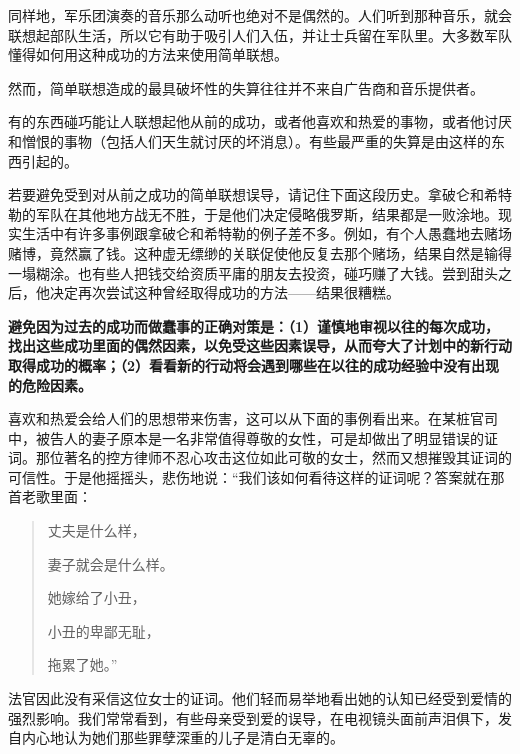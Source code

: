 同样地，军乐团演奏的音乐那么动听也绝对不是偶然的。人们听到那种音乐，就会联想起部队生活，所以它有助于吸引人们入伍，并让士兵留在军队里。大多数军队懂得如何用这种成功的方法来使用简单联想。
\par

然而，简单联想造成的最具破坏性的失算往往并不来自广告商和音乐提供者。
\par

有的东西碰巧能让人联想起他从前的成功，或者他喜欢和热爱的事物，或者他讨厌和憎恨的事物（包括人们天生就讨厌的坏消息）。有些最严重的失算是由这样的东西引起的。
\par

若要避免受到对从前之成功的简单联想误导，请记住下面这段历史。拿破仑和希特勒的军队在其他地方战无不胜，于是他们决定侵略俄罗斯，结果都是一败涂地。现实生活中有许多事例跟拿破仑和希特勒的例子差不多。例如，有个人愚蠢地去赌场赌博，竟然赢了钱。这种虚无缥缈的关联促使他反复去那个赌场，结果自然是输得一塌糊涂。也有些人把钱交给资质平庸的朋友去投资，碰巧赚了大钱。尝到甜头之后，他决定再次尝试这种曾经取得成功的方法——结果很糟糕。
\par

\textbf{避免因为过去的成功而做蠢事的正确对策是：（1）谨慎地审视以往的每次成功，找出这些成功里面的偶然因素，以免受这些因素误导，从而夸大了计划中的新行动取得成功的概率；（2）看看新的行动将会遇到哪些在以往的成功经验中没有出现的危险因素。}
\par

喜欢和热爱会给人们的思想带来伤害，这可以从下面的事例看出来。在某桩官司中，被告人的妻子原本是一名非常值得尊敬的女性，可是却做出了明显错误的证词。那位著名的控方律师不忍心攻击这位如此可敬的女士，然而又想摧毁其证词的可信性。于是他摇摇头，悲伤地说：“我们该如何看待这样的证词呢？答案就在那首老歌里面：
\par

\begin{quotation}
丈夫是什么样，
\par

妻子就会是什么样。
\par

她嫁给了小丑，
\par

小丑的卑鄙无耻，
\par

拖累了她。”
\par
\end{quotation}

法官因此没有采信这位女士的证词。他们轻而易举地看出她的认知已经受到爱情的强烈影响。我们常常看到，有些母亲受到爱的误导，在电视镜头面前声泪俱下，发自内心地认为她们那些罪孽深重的儿子是清白无辜的。
\par

